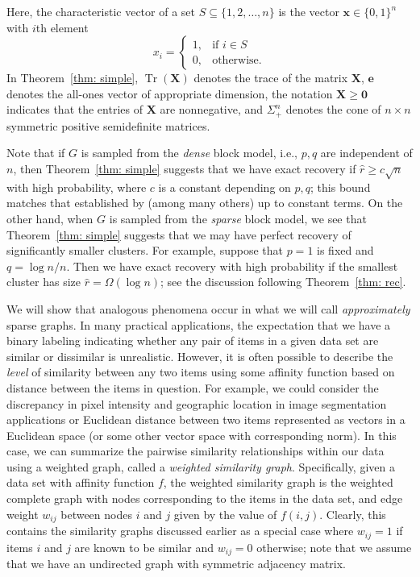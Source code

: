 \documentclass[twoside,11pt]{article}
\newcommand{\R}{\mathbf{R}}
\DeclareMathOperator{\tr}{{Tr}}
\newcommand{\e}{\bs {e}}
\newcommand{\bs}{\boldsymbol}
\newcommand{\x}{\bs {x}}
\newcommand{\X}{\bs {X}}
\newcommand{\0}{\bs{0}}
\newcommand{\branchdef}[1] {\ensuremath{ \left\{\begin{array}{rl} #1 \end{array} \right. }} %
\begin{document}
Here, the characteristic vector of a set
\(S \subseteq \{1,2,\dots, n\}\) is the vector \( \x \in \{0,1\}^n \) %
with \(i\)th element
\[
x_i = \branchdef{ 1, & \mbox{if } i \in S \\ 0, &\mbox{otherwise.}}
\]
In Theorem~\ref{thm: simple}, \(\tr(\X) \) denotes the trace of the matrix \(\X\),
\(\e\) denotes the all-ones vector of appropriate dimension,
the notation \(\X \ge \0\) indicates that the entries of \(\X\) are nonnegative,
and \(\Sigma_+^n\) denotes the cone of \(n\times n\) symmetric positive semidefinite matrices.

Note that if \(G\) is sampled from the \emph{dense} block model, i.e., \(p,q\) are independent of \(n\), then Theorem~\ref{thm: simple} suggests that we have exact recovery if \( \hat r \ge c \sqrt{n}\) with high probability, where \(c\) is a constant
depending on \(p, q\); this bound matches that established by \cite{ames2014guaranteed} (among many others) up to
constant terms.
On the other hand, when \(G\) is sampled from the \emph{sparse} block model,
we see that Theorem~\ref{thm: simple} suggests that we may have perfect recovery of significantly smaller clusters.
For example, suppose that \(p=1\) is fixed and \(q = \log n/ n\).
Then we have exact recovery with high probability if
the smallest cluster has size \(\hat r = \Omega( \log n)\);
see the discussion following Theorem~\ref{thm: rec}.



We will show that analogous phenomena occur in what we will call
\emph{approximately} sparse graphs.
In many practical applications, the expectation that we have a binary labeling
indicating whether any pair of items in a given data set are similar
or dissimilar is unrealistic. However, it is often possible to
describe the \emph{level} of similarity between any two items using some affinity
function based on distance between the items in question.
For example, we could consider the discrepancy in pixel intensity and geographic
location in image segmentation applications or Euclidean distance between
two items represented as vectors in a Euclidean space (or some other vector
space with corresponding norm).
In this case, we can summarize the pairwise similarity relationships within our
data using
a weighted graph, called a \emph{weighted similarity graph}.
Specifically, given a data set with affinity function \(f\),
the weighted similarity graph is the weighted complete graph with nodes
corresponding to the items in the data set, and edge weight \(w_{ij}\)
between nodes \(i\) and \(j\) given by the value of \(f(i,j)\).
Clearly, this contains the similarity graphs discussed earlier as a
special case where \(w_{ij} = 1\) if items \(i\) and \(j\) are known
to be similar and \(w_{ij} = 0\) otherwise; note that we assume that we have an undirected graph with
symmetric adjacency matrix.
\end{document}
